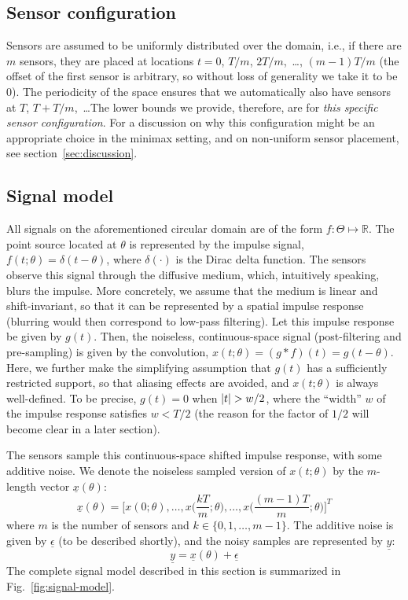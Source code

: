 \documentclass[conference]{IEEEtran}
\providecommand{\v}{}
\renewcommand{\v}[1]{\underline{#1}}
\DeclarePairedDelimiter\abs{\lvert}{\rvert}
\begin{document}
\subsection{Sensor configuration}

Sensors are assumed to be uniformly distributed over the domain, i.e., if there
are $m$ sensors, they are placed at locations $t = 0$, $T/m$, $2T/m$,~\dots,
$(m{-}1)T/m$ (the offset of the first sensor is arbitrary, so without loss of
generality we take it to be 0). The periodicity of the space ensures that we
automatically also have sensors at $T$, $T{+}T/m$,~\dots\@ The lower bounds we
provide, therefore, are for \emph{this specific sensor configuration}. For a
discussion on why this configuration might be an appropriate choice in the
minimax setting, and on non-uniform sensor placement, see
section~\ref{sec:discussion}.

\subsection{Signal model}
\label{sec:signal-model}

All signals on the aforementioned circular domain are of the form
$f:\Theta\mapsto\mathbb{R}$.  The point source located at $\theta$ is
represented by the impulse signal, $f(t;\theta) = \delta(t - \theta)$, where
$\delta(\cdot)$ is the Dirac delta function.  The sensors observe this signal
through the diffusive medium, which, intuitively speaking, blurs the impulse.
More concretely, we assume that the medium is linear and shift-invariant, so
that it can be represented by a spatial impulse response (blurring would then
correspond to low-pass filtering). Let this impulse response be given by
$g(t)$. Then, the noiseless, continuous-space signal (post-filtering and
pre-sampling) is given by the convolution, $x(t; \theta) = (g*f)(t) = g(t -
\theta)$. Here, we further make the simplifying assumption that $g(t)$ has a
sufficiently restricted support, so that aliasing effects are avoided, and
$x(t; \theta)$ is always well-defined. To be precise, $g(t) = 0$ when $\abs{t}
> w/2$, where the ``width'' $w$ of the impulse response satisfies $w < T / 2$
(the reason for the factor of $1/2$ will become clear in a later section).

The sensors sample this continuous-space shifted impulse response, with some
additive noise. We denote the noiseless sampled version of $x(t; \theta)$ by
the $m$-length vector $\v x(\theta)$:
\begin{equation} \label{eq:sampled-signal}
	\v x(\theta) = \bigg[x(0; \theta), \ldots, x\Big(\frac{kT}{m}; \theta\Big), \ldots, x\Big(\frac{(m-1)T}{m}; \theta\Big)\bigg]^T
\end{equation}
where $m$ is the number of sensors and $k \in \{0, 1, \ldots, m-1\}$. The
additive noise is given by $\v \epsilon$ (to be described shortly), and the
noisy samples are represented by $\v y$:
\begin{equation} \label{eq:sensor-obs}
	\v y = \v x(\theta) + \v \epsilon
\end{equation}
The complete signal model described in this section is summarized in
Fig.~\ref{fig:signal-model}.
\end{document}
